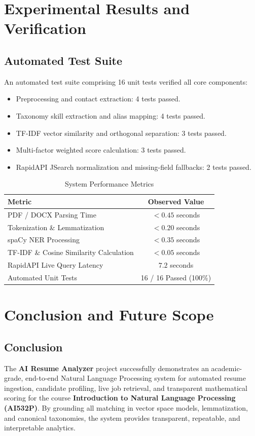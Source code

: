 \documentclass[12pt,a4paper]{report}
\begin{document}
\chapter{Experimental Results and Verification}

\section{Automated Test Suite}
An automated test suite comprising 16 unit tests verified all core components:
\begin{itemize}
    \item Preprocessing and contact extraction: 4 tests passed.
    \item Taxonomy skill extraction and alias mapping: 4 tests passed.
    \item TF-IDF vector similarity and orthogonal separation: 3 tests passed.
    \item Multi-factor weighted score calculation: 3 tests passed.
    \item RapidAPI JSearch normalization and missing-field fallbacks: 2 tests passed.
\end{itemize}

\begin{table}[h]
\centering
\caption{System Performance Metrics}
\begin{tabular}{lc}
\toprule
\textbf{Metric} & \textbf{Observed Value} \\
\midrule
PDF / DOCX Parsing Time & $< 0.45$ seconds \\
Tokenization \& Lemmatization & $< 0.20$ seconds \\
spaCy NER Processing & $< 0.35$ seconds \\
TF-IDF \& Cosine Similarity Calculation & $< 0.05$ seconds \\
RapidAPI Live Query Latency & $7.2$ seconds \\
Automated Unit Tests & 16 / 16 Passed (100\%) \\
\bottomrule
\end{tabular}
\end{table}

\chapter{Conclusion and Future Scope}

\section{Conclusion}
The \textbf{AI Resume Analyzer} project successfully demonstrates an academic-grade, end-to-end Natural Language Processing system for automated resume ingestion, candidate profiling, live job retrieval, and transparent mathematical scoring for the course \textbf{Introduction to Natural Language Processing (AI532P)}. By grounding all matching in vector space models, lemmatization, and canonical taxonomies, the system provides transparent, repeatable, and interpretable analytics.
\end{document}
